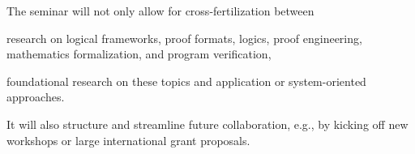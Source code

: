 The seminar will not only allow for cross-fertilization between
 \begin{compactitem}
  \item research on logical frameworks, proof formats, logics, proof
engineering, mathematics formalization, and program verification,
  \item foundational research on these topics and application or system-oriented
approaches.
 \end{compactitem} It will also structure and streamline future collaboration,
e.g., by kicking off new workshops or large international grant proposals.


